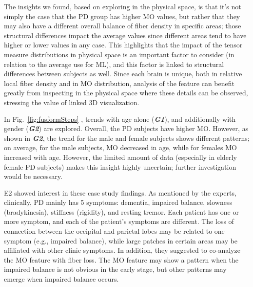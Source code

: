 The insights we found, based on exploring in the physical space, is that it's not simply the case that the PD group has higher MO values, but rather that they may also have a different overall balance of fiber density in specific areas; those structural differences impact the average values since different areas tend to have higher or lower values in any case. This highlights that the impact of the tensor measure distributions in physical space is an important factor to consider (in relation to the average use for ML), and this factor is linked to structural differences between subjects as well. Since each brain is unique, both in relative local fiber density and in MO distribution, analysis of the feature can benefit greatly from inspecting in the physical space where these details can be observed, stressing the value of linked 3D visualization.  


In Fig.~\ref{fig:fusformSteps} , trends with age alone (\textbf{\textit{G1}}), and additionally with gender (\textbf{\textit{G2}}) are explored. Overall, the PD subjects have higher MO. However, as shown in \textbf{\textit{G2}}, the trend for the male and female subjects shows different patterns; on average, for the male subjects, MO decreased in age, while for females MO increased with age. However, the limited amount of data (especially in elderly female PD subjects) makes this insight highly uncertain; further investigation would be necessary. 

E2 showed interest in these case study findings. As mentioned by the experts, clinically, PD mainly has 5 symptoms: dementia, impaired balance, slowness (bradykinesia), stiffness (rigidity), and resting tremor. Each patient has one or more symptom, and each of the patient's symptoms are different. The loss of connection between the occipital and parietal lobes may be related to one symptom (e.g., impaired balance), while large patches in certain areas may be affiliated with other clinic symptoms. In addition, they suggested to co-analyze 
the MO feature with fiber loss. The MO feature may show a pattern when the impaired balance is not obvious in the early stage, but other patterns may emerge when impaired balance occurs.


